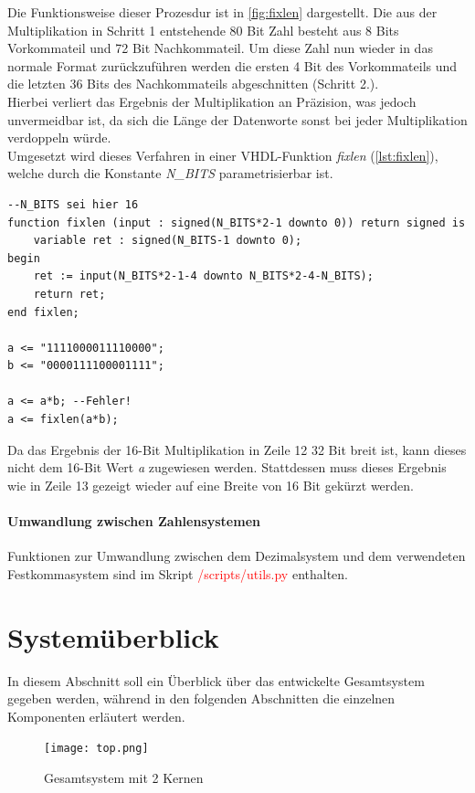 \documentclass[a4paper,12pt,onesided]{report}
\begin{document}
Die Funktionsweise dieser Prozesdur ist in \autoref{fig:fixlen} dargestellt.
Die aus der Multiplikation in Schritt 1 entstehende 80 Bit Zahl besteht aus 8 Bits Vorkommateil und 72 Bit Nachkommateil.
Um diese Zahl nun wieder in das normale Format zurückzuführen werden die ersten 4 Bit des Vorkommateils und die letzten 36 Bits des Nachkommateils abgeschnitten (Schritt 2.).\\
Hierbei verliert das Ergebnis der Multiplikation an Präzision, was jedoch unvermeidbar ist, da sich die Länge der Datenworte sonst bei jeder Multiplikation verdoppeln würde.\\
Umgesetzt wird dieses Verfahren in einer VHDL-Funktion \textit{fixlen} (\autoref{lst:fixlen}), welche durch die Konstante \textit{N\_BITS} parametrisierbar ist.
\begin{lstlisting}[label=lst:fixlen,caption=VHDL-Funktion \textit{fixlen} aus \textcolor{red}{/src/mandel-zybo.srcs/sources\_1/imports/new/mbcore.vhd}]
--N_BITS sei hier 16
function fixlen (input : signed(N_BITS*2-1 downto 0)) return signed is
	variable ret : signed(N_BITS-1 downto 0);
begin
	ret := input(N_BITS*2-1-4 downto N_BITS*2-4-N_BITS);
	return ret;
end fixlen;

a <= "1111000011110000";
b <= "0000111100001111";

a <= a*b; --Fehler!
a <= fixlen(a*b);
\end{lstlisting}
Da das Ergebnis der 16-Bit Multiplikation in Zeile 12 32 Bit breit ist, kann dieses nicht dem 16-Bit Wert \textit{a} zugewiesen werden.
Stattdessen muss dieses Ergebnis wie in Zeile 13 gezeigt wieder auf eine Breite von 16 Bit gekürzt werden.

\paragraph{Umwandlung zwischen Zahlensystemen}
Funktionen zur Umwandlung zwischen dem Dezimalsystem und dem verwendeten Festkommasystem sind im Skript \textcolor{red}{/scripts/utils.py} enthalten.

\section{Systemüberblick}
\label{sec:überblick}
In diesem Abschnitt soll ein Überblick über das entwickelte Gesamtsystem gegeben werden, während in den folgenden Abschnitten die einzelnen Komponenten erläutert werden.

\begin{figure}[H]
	\centering
	\texttt{[image: top.png]}
	\caption{Gesamtsystem mit 2 Kernen}
	\label{fig:top}
\end{figure}
\end{document}
